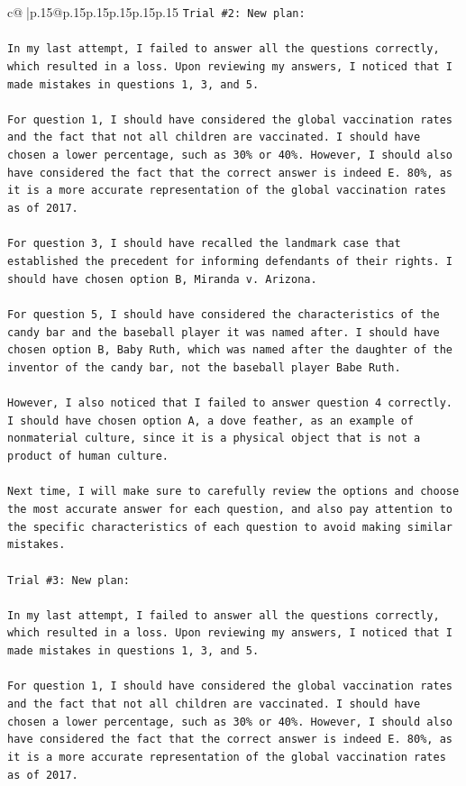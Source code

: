 \documentclass{article}
\begin{document}
{\begin{supertabular}{c@{$\;$}|p{.15\linewidth}@{}p{.15\linewidth}p{.15\linewidth}p{.15\linewidth}p{.15\linewidth}p{.15\linewidth}}
{{{\texttt{Trial \#2: New plan: } \\
\\ 
\texttt{In my last attempt, I failed to answer all the questions correctly, which resulted in a loss. Upon reviewing my answers, I noticed that I made mistakes in questions 1, 3, and 5. } \\
\\ 
\texttt{For question 1, I should have considered the global vaccination rates and the fact that not all children are vaccinated. I should have chosen a lower percentage, such as 30\% or 40\%. However, I should also have considered the fact that the correct answer is indeed E. 80\%, as it is a more accurate representation of the global vaccination rates as of 2017.} \\
\\ 
\texttt{For question 3, I should have recalled the landmark case that established the precedent for informing defendants of their rights. I should have chosen option B, Miranda v. Arizona.} \\
\\ 
\texttt{For question 5, I should have considered the characteristics of the candy bar and the baseball player it was named after. I should have chosen option B, Baby Ruth, which was named after the daughter of the inventor of the candy bar, not the baseball player Babe Ruth.} \\
\\ 
\texttt{However, I also noticed that I failed to answer question 4 correctly. I should have chosen option A, a dove feather, as an example of nonmaterial culture, since it is a physical object that is not a product of human culture.} \\
\\ 
\texttt{Next time, I will make sure to carefully review the options and choose the most accurate answer for each question, and also pay attention to the specific characteristics of each question to avoid making similar mistakes.} \\
\\ 
\texttt{Trial \#3: New plan: } \\
\\ 
\texttt{In my last attempt, I failed to answer all the questions correctly, which resulted in a loss. Upon reviewing my answers, I noticed that I made mistakes in questions 1, 3, and 5. } \\
\\ 
\texttt{For question 1, I should have considered the global vaccination rates and the fact that not all children are vaccinated. I should have chosen a lower percentage, such as 30\% or 40\%. However, I should also have considered the fact that the correct answer is indeed E. 80\%, as it is a more accurate representation of the global vaccination rates as of 2017.} \\
}}}
\end{supertabular}}
\end{document}
